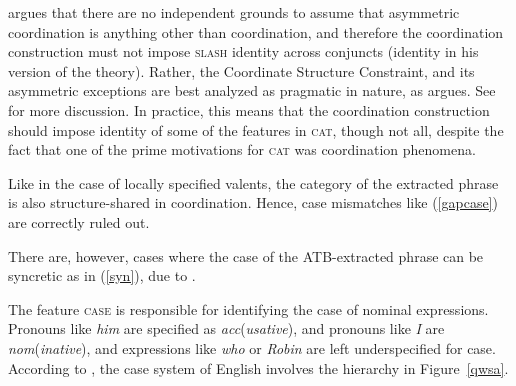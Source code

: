 \documentclass[output=paper
                ,modfonts
                ,nonflat
	        ,collection
	        ,collectionchapter
	        ,collectiontoclongg
 	        ,biblatex
                ,babelshorthands
                ,newtxmath
                ,draftmode
                ,colorlinks, citecolor=brown
]{./langsci/langscibook}
\begin{document}
{\citet{chavesextr} argues that there are no independent grounds to assume that asymmetric coordination is anything other than coordination, and therefore the coordination construction must not impose \textsc{slash} identity across conjuncts (\gap identity in his version of the theory). Rather, the Coordinate Structure Constraint, and its asymmetric exceptions are best analyzed as
pragmatic in nature, as \citet[Chapter~5]{kehler} argues. 
See  for more discussion.
In practice, this means that the coordination construction should impose identity of some of the features in \textsc{cat}, though not all, despite the fact that one of the prime motivations for \textsc{cat} was
coordination phenomena.

Like in the case of locally specified valents, the category of the extracted phrase is also structure-shared
in coordination. Hence, case mismatches like (\ref{gapcase}) are
correctly ruled out.


\z

\noindent
There are, however, cases where the case of the ATB-extracted phrase can be syncretic as in (\ref{syn}), 
due to \citet[205]{levineetal}. 

\eal
\label{syn}

\zl

The feature \textsc{case} is responsible for identifying the case of nominal expressions.
Pronouns like \emph{him} are specified as \emph{acc}(\emph{usative}), and pronouns like
\emph{I} are \emph{nom}(\emph{inative}), and expressions like \emph{who} or
\emph{Robin} are left underspecified for case.
According to  \citet[207]{levineetal},  the case system of English involves 
the  hierarchy  in Figure~\ref{qwsa}.


}
\end{document}

